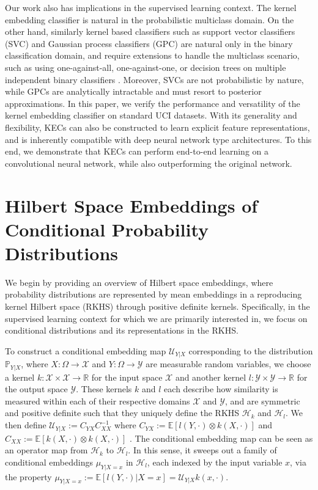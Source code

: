 \documentclass{article}
\begin{document}
	Our work also has implications in the supervised learning context. The kernel embedding classifier is natural in the probabilistic multiclass domain. On the other hand, similarly kernel based classifiers such as support vector classifiers (SVC) \citep{m2001introduction} and Gaussian process classifiers (GPC) \citep{rasmussen2006gaussian} are natural only in the binary classification domain, and require extensions to handle the multiclass scenario, such as using one-against-all, one-against-one, or decision trees on multiple independent binary classifiers \citep{aly2005survey, hsu2002comparison}. Moreover, SVCs are not probabilistic by nature, while GPCs are analytically intractable and must resort to posterior approximations. In this paper, we verify the performance and versatility of the kernel embedding classifier on standard UCI datasets. With its generality and flexibility, KECs can also be constructed to learn explicit feature representations, and is inherently compatible with deep neural network type architectures. To this end, we demonstrate that KECs can perform end-to-end learning on a convolutional neural network, while also outperforming the original network.

\section{Hilbert Space Embeddings of Conditional Probability Distributions}
\label{sec:background}

	We begin by providing an overview of Hilbert space embeddings, where probability distributions are represented by mean embeddings in a reproducing kernel Hilbert space (RKHS) through positive definite kernels. Specifically, in the supervised learning context for which we are primarily interested in, we focus on conditional distributions and its representations in the RKHS.
	
	To construct a conditional embedding map $\mathcal{U}_{Y | X}$ corresponding to the distribution $\mathbb{P}_{Y | X}$, where $X : \Omega \to \mathcal{X}$ and $Y: \Omega \to \mathcal{Y}$ are measurable random variables, we choose a kernel $k : \mathcal{X} \times \mathcal{X} \to \mathbb{R}$ for the input space $\mathcal{X}$ and another kernel $l : \mathcal{Y} \times \mathcal{Y} \to \mathbb{R}$ for the output space $\mathcal{Y}$. These kernels $k$ and $l$ each describe how similarity is measured within each of their respective domains $\mathcal{X}$ and $\mathcal{Y}$, and are symmetric and positive definite such that they uniquely define the RKHS $\mathcal{H}_{k}$ and $\mathcal{H}_{l}$. We then define $\mathcal{U}_{Y | X} := C_{YX} C_{XX}^{-1}$ where $C_{YX} := \mathbb{E}[l(Y, \cdot) \otimes k(X, \cdot)]$ and $C_{XX} := \mathbb{E}[k(X, \cdot) \otimes k(X, \cdot)]$ \citep{song2009hilbert}. The conditional embedding map can be seen as an operator map from $\mathcal{H}_{k}$ to $\mathcal{H}_{l}$. In this sense, it sweeps out a family of conditional embeddings $\mu_{Y | X = x}$ in $\mathcal{H}_{l}$, each indexed by the input variable $x$, via the property $\mu_{Y | X = x} := \mathbb{E}[l(Y, \cdot) | X = x] = \mathcal{U}_{Y | X} k(x, \cdot)$.
	
\end{document}
